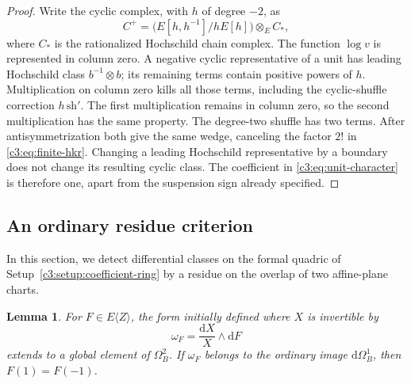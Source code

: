 \documentclass[11pt,a4paper]{amsart}
\numberwithin{equation}{section}
\newtheorem{lemma}[theorem]{Lemma}
\theoremstyle{definition}
\theoremstyle{remark}
\newcommand{\Cthreedd}{\mathrm{d}}
\begin{document}
\begin{proof}
Write the cyclic complex, with $h$ of degree $-2$, as
\[
 C^+=\bigl(E[h,h^{-1}]/hE[h]\bigr)\otimes_E C_\ast,
\]
where $C_\ast$ is the rationalized Hochschild chain complex.
The function $\log v$ is represented in column zero.
A negative cyclic representative of a unit has leading Hochschild
class $b^{-1}\otimes b$; its remaining terms contain positive powers
of $h$.
Multiplication on column zero kills all those terms, including the
cyclic-shuffle correction $h\,\mathrm{sh}'$.
The first multiplication remains in column zero, so the second
multiplication has the same property.
The degree-two shuffle has two terms.
After antisymmetrization both give the same wedge, canceling the
factor $2!$ in \eqref{c3:eq:finite-hkr}.
Changing a leading Hochschild representative by a boundary does not
change its resulting cyclic class.
The coefficient in \eqref{c3:eq:unit-character} is therefore one,
apart from the suspension sign already specified.
\end{proof}

\subsection{An ordinary residue criterion}\label{c3:sec:residue}

In this section, we detect differential classes on the formal quadric
of Setup~\ref{c3:setup:coefficient-ring} by a residue on the overlap of two
affine-plane charts.

\begin{lemma}
\label{c3:lem:ordinary-residue}
For $F\in E\langle Z\rangle$, the form initially defined where $X$ is
invertible by
\[
 \omega_F=\frac{\Cthreedd X}{X}\wedge\Cthreedd F
\]
extends to a global element of $\Omega_B^2$.
If $\omega_F$ belongs to the ordinary image $\Cthreedd\Omega_B^1$, then
$F(1)=F(-1)$.
\end{lemma}
\end{document}
